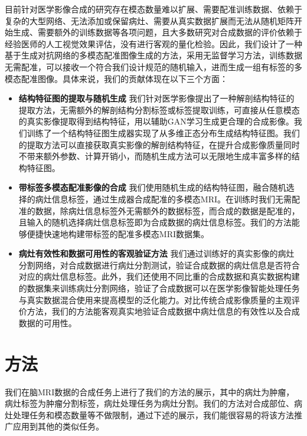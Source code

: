 \documentclass[letterpaper]{article} %
\begin{document}
目前针对医学影像合成的研究存在模态数量难以扩展、需要配准训练数据、依赖于复杂的大型网络、无法添加或保留病灶、需要从真实数据扩展而无法从随机矩阵开始生成、需要额外的训练数据等各项问题，且大多数研究对合成数据的评价依赖于经验医师的人工视觉效果评估，没有进行客观的量化检验。因此，我们设计了一种基于生成对抗网络的多模态配准图像生成的方法，采用无监督学习方法，训练数据无需配准，可以接收一个符合我们设计规范的随机输入，进而生成一组有标签的多模态配准图像。具体来说，我们的贡献体现在以下三个方面：
\begin{itemize}
\item \textbf{结构特征图的提取与随机生成}
我们针对医学影像提出了一种解剖结构特征的提取方法，无需额外的解剖结构分割标签或标签提取训练，可直接从任意模态的真实影像提取得到结构特征，用以辅助GAN学习生成更合理的合成影像。我们训练了一个结构特征图生成器实现了从多维正态分布生成结构特征图。我们的提取方法可以直接获取真实影像的解剖结构特征，在提升合成影像质量同时不带来额外参数、计算开销小，而随机生成方法可以无限地生成丰富多样的结构特征图。
\item \textbf{带标签多模态配准影像的合成}
我们使用随机生成的结构特征图，融合随机选择的病灶信息标签，通过生成器合成配准的多模态MRI。在训练时我们无需配准的数据，除病灶信息标签外无需额外的数据标签，而合成的数据是配准的，且输入的随机选择病灶信息标签即为合成数据的病灶信息标签。我们的方法能够便捷快速地构建带标签的配准多模态MRI数据集。
\item \textbf{病灶有效性和数据可用性的客观验证方法}
我们通过训练好的真实影像的病灶分割网络，对合成数据进行病灶分割测试，验证合成数据的病灶信息是否符合对应的病灶信息标签。此外，我们还使用不同比重的合成数据和真实数据构建的数据集来训练病灶分割网络，验证了合成数据可以在医学影像智能处理任务与真实数据混合使用来提高模型的泛化能力。对比传统合成影像质量的主观评价方法，我们的方法能客观真实地验证合成数据中病灶信息的有效性以及合成数据的可用性。
\end{itemize}

\section{方法}
我们在脑MRI数据的合成任务上进行了我们的方法的展示，其中的病灶为肿瘤，病灶标签为肿瘤分割标签，病灶处理任务为病灶分割。我们的方法对合成部位、病灶处理任务和模态数量等不做限制，通过下述的展示，我们能很容易的将该方法推广应用到其他的类似任务。
\end{document}

